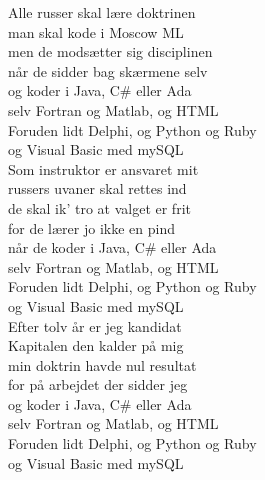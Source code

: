 Alle russer skal lære doktrinen\\
man skal kode i Moscow ML\\
men de modsætter sig disciplinen\\
når de sidder bag skærmene selv\\

og koder i Java, C\# eller Ada\\
selv Fortran og Matlab, og HTML\\
Foruden lidt Delphi, og Python og Ruby\\
og Visual Basic med mySQL\\

Som instruktor er ansvaret mit\\
russers uvaner skal rettes ind\\
de skal ik' tro at valget er frit\\
for de lærer jo ikke en pind\\

når de koder i Java, C\# eller Ada\\
selv Fortran og Matlab, og HTML\\
Foruden lidt Delphi, og Python og Ruby\\
og Visual Basic med mySQL\\

Efter tolv år er jeg kandidat\\
Kapitalen den kalder på mig\\
min doktrin havde nul resultat\\
for på arbejdet der sidder jeg\\

og koder i Java, C\# eller Ada\\
selv Fortran og Matlab, og HTML\\
Foruden lidt Delphi, og Python og Ruby\\
og Visual Basic med mySQL\\
